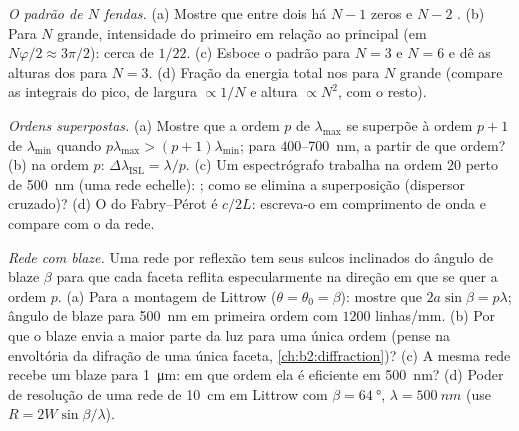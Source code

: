 \begin{exercise}[$\star\star$]\label{exo:b2:gratings:5}
\emph{O padrão de $N$ fendas.} (a) Mostre que entre dois 
há $N - 1$ zeros e $N - 2$ . (b) Para $N$ grande,
intensidade do primeiro  em relação ao principal
(em $N\varphi/2 \approx 3\pi/2$): cerca de $1/22$. (c) Esboce o padrão para
$N = 3$ e $N = 6$ e dê as alturas dos  para
$N = 3$. (d) Fração da energia total nos  para
$N$ grande (compare as integrais do pico, de largura $\propto 1/N$ e altura
$\propto N^2$, com o resto).
\end{exercise}

\begin{exercise}[$\star\star$]\label{exo:b2:gratings:6}
\emph{Ordens superpostas.} (a) Mostre que a ordem $p$ de $\lambda_{\max}$ se superpõe à
ordem $p + 1$ de $\lambda_{\min}$ quando $p\lambda_{\max} > (p + 1)\lambda_{\min}$; para $400$--\qty{700}{nm},
a partir de que ordem? (b)  na ordem $p$: $\Delta\lambda_{\text{ISL}}
= \lambda/p$. (c) Um espectrógrafo trabalha na ordem $20$ perto de \qty{500}{nm} (uma
rede echelle): ; como se elimina a superposição
(dispersor cruzado)? (d) O  do Fabry--Pérot é $c/2L$:
escreva-o em comprimento de onda e compare com o da rede.
\end{exercise}

\begin{exercise}[$\star\star$]\label{exo:b2:gratings:7}
\emph{Rede com blaze.} Uma rede por reflexão tem seus sulcos inclinados do
ângulo de blaze $\beta$ para que cada faceta reflita especularmente na
direção em que se quer a ordem $p$. (a) Para a montagem de Littrow
($\theta = \theta_0 = \beta$): mostre que $2a\sin\beta = p\lambda$; ângulo de blaze para
\qty{500}{nm} em primeira ordem com $1200$ linhas/mm. (b) Por que o blaze envia a maior parte da
luz para uma única ordem (pense na envoltória da difração de uma única
faceta, \cref{ch:b2:diffraction})? (c) A mesma rede recebe um blaze
para \qty{1}{\micro m}: em que ordem ela é eficiente em \qty{500}{nm}? (d)
Poder de resolução de uma rede de \qty{10}{cm} em Littrow com $\beta = \qty{64}{\degree}$,
$\lambda = \qty{500}{nm}$ (use $R = 2W\sin\beta/\lambda$).
\end{exercise}

